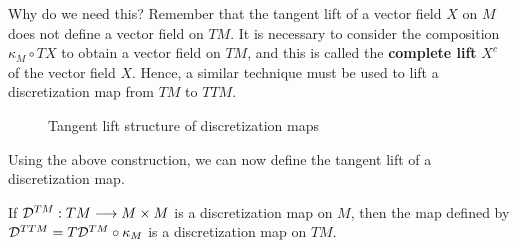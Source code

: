 \begin{rmk}{Why do we need this?}
  Remember that the tangent lift of a vector field $X$ on $M$ does not define a vector field on $TM$. It is necessary to consider the composition $\kappa_M \circ TX$ to obtain a vector field on $TM$, and this is called the \textbf{complete lift} $X^c$ of the vector field $X$. 
  Hence, a similar technique must be used to lift a discretization map from $TM$ to $TTM$.
\end{rmk}

\begin{figure}[h]
  \centering
  \caption{Tangent lift structure of discretization maps}
  \label{fig:tangent-lift}
\end{figure}

Using the above construction, we can now define the tangent lift of a discretization map.

\begin{prop}
  If $\mathcal{D}^{TM} : TM \longrightarrow M \times M$ is a discretization map on $M$, then the map defined by $\mathcal{D}^{TTM} = T\mathcal{D}^{TM} \circ \kappa_M$ is a discretization map on $TM$.
\end{prop}

